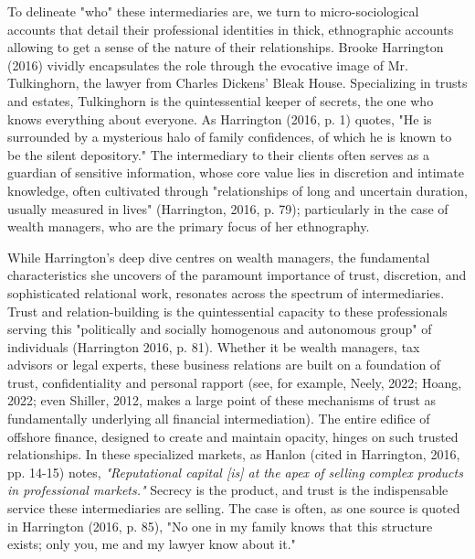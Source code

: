 To delineate "who" these intermediaries are, we turn to micro-sociological accounts that detail their professional identities in thick, ethnographic accounts allowing to get a sense of the nature of their relationships. Brooke Harrington (2016) vividly encapsulates the role through the evocative image of Mr. Tulkinghorn, the lawyer from Charles Dickens' Bleak House. Specializing in trusts and estates, Tulkinghorn is the quintessential keeper of secrets, the one who knows everything about everyone. As Harrington (2016, p. 1) quotes, "He is surrounded by a mysterious halo of family confidences, of which he is known to be the silent depository." The intermediary to their clients often serves as a guardian of sensitive information, whose core value lies in discretion and intimate knowledge, often cultivated through "relationships of long and uncertain duration, usually measured in lives" (Harrington, 2016, p. 79); particularly in the case of wealth managers, who are the primary focus of her ethnography.

While Harrington’s deep dive centres on wealth managers, the fundamental characteristics she uncovers of the paramount importance of trust, discretion, and sophisticated relational work, resonates across the spectrum of intermediaries. Trust and relation-building is the quintessential capacity to these professionals serving this "politically and socially homogenous and autonomous group" of individuals (Harrington 2016, p. 81). Whether it be wealth managers, tax advisors or legal experts, these business relations are built on a foundation of trust, confidentiality and personal rapport (see, for example, Neely, 2022; Hoang, 2022; even Shiller, 2012, makes a large point of these mechanisms of trust as fundamentally underlying all financial intermediation). The entire edifice of offshore finance, designed to create and maintain opacity, hinges on such trusted relationships. In these specialized markets, as Hanlon (cited in Harrington, 2016, pp. 14-15) notes, \textit{"Reputational capital [is] at the apex of selling complex products in professional markets."} Secrecy is the product, and trust is the indispensable service these intermediaries are selling. The case is often, as one source is quoted in Harrington (2016, p. 85), "No one in my family knows that this structure exists; only you, me and my lawyer know about it." 

